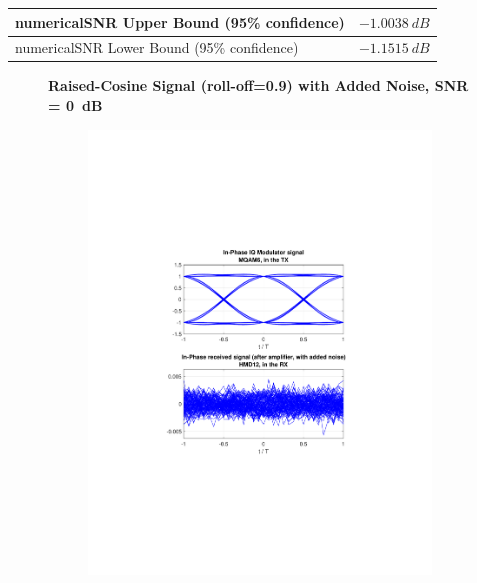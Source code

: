 \begin{refsection}
\begin{table}[H]
\begin{tabular}{|l|l|}
		numericalSNR Upper Bound (95\% confidence) & $-1.0038~dB$                             					\\ \hline
		numericalSNR Lower Bound (95\% confidence) & $-1.1515~dB$                             					\\ \hline
	\end{tabular}
\end{table}
\begin{figure}[H]
		\centering
	\textbf{Raised-Cosine Signal (roll-off=0.9) with Added Noise, SNR = 0~dB}
	\begin{minipage}{\linewidth}
		\centering
	\begin{subfigure}{.45\textwidth}
		\centering
		\includegraphics[clip, trim=4cm 7cm 4cm 7cm, 
		width=\textwidth]{./sdf/m_qam_system/figures/eyes/simulRc09Sp60Np60_i.pdf}

\end{subfigure}
\end{minipage}
\end{figure}
\end{refsection}
